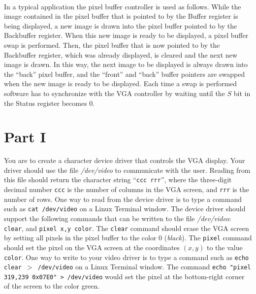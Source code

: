 \documentclass[epsfig,10pt,fullpage]{article}
\begin{document}
~\\
\noindent
In a typical application the pixel buffer controller is used as follows. While the image
contained in the pixel buffer that is pointed to by the Buffer register is being displayed, 
a new image is drawn into the pixel buffer pointed to by the Backbuffer register. When this new
image is ready to be displayed, a pixel buffer swap is performed. Then, the pixel buffer 
that is now pointed to by the Backbuffer register, which was already displayed, is cleared and 
the next new image is drawn. In this way, the next image to be displayed is always drawn into
the ``back'' pixel buffer, and the ``front'' and ``back'' buffer pointers are swapped when 
the new image is ready to be displayed. Each time a swap is performed software has to 
synchronize with the VGA controller by waiting until the $S$ bit in the Status register becomes 0.

\noindent
\section*{Part I}

\noindent
You are to create a character device driver that controls the VGA display.
Your driver should use the file {\it /dev/video} to communicate with the user. Reading
from this file should return the character string ``\texttt{ccc rrr}'', where the three-digit
decimal number \texttt{ccc} is the number of columns in the VGA screen, and \texttt{rrr} is
the number of rows. One way to read from the device driver is to type a command such as
\texttt{cat /dev/video} on a Linux Terminal window. The device driver should support the
following commands that can be written to the file {\it /dev/video}: \texttt{clear}, 
and \texttt{pixel x,y color}. The \texttt{clear} command should erase the 
VGA screen by setting all pixels in the pixel 
buffer to the color 0 ({\it black}). The \texttt{pixel} command should set the pixel on the VGA
screen at the coordinates $(x, y)$ to the value \texttt{color}. One way to write to your
video driver is to type a command such as \texttt{echo clear $>$ /dev/video} on a Linux 
Terminal window. The command \texttt{echo "pixel 319,239 0x07E0" > /dev/video} would set the 
pixel at the bottom-right corner of the screen to the color green. 
\end{document}
